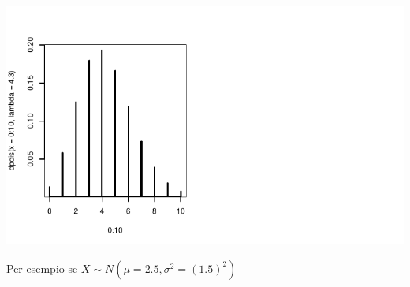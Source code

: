 \documentclass[
  11pt,
]{book}
\theoremstyle{mytheoremstyle}
\theoremstyle{mydefstyle}
\begin{document}
\begin{center}\includegraphics{Appunti_di_Statistica_2025_files/figure-latex/24-Libro-41,-1} \end{center}

Per esempio se \(X\sim N(\mu=2.5,\sigma^2=(1.5)^2)\)
\end{document}
